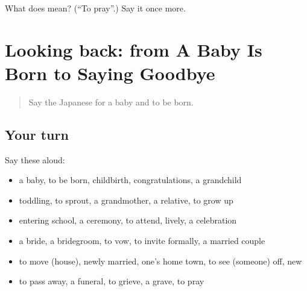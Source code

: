 \begin{tcolorbox}[breakable,colback=teal!4,colframe=teal!35!black,title={Before you move on}]
What does  mean? (\textquotedblleft{}To pray\textquotedblright{}.) Say it once more.
\end{tcolorbox}
\section[(dialogue)]{Looking back: from A Baby Is Born to Saying Goodbye}

\label{lesson:JA-R291-review-286-291}



\begin{quote}
Say the Japanese for a baby and to be born.
\end{quote}

\subsection*{Your turn}
Say these aloud:

\begin{itemize}
\raggedright
  \item a baby, to be born, childbirth, congratulations, a grandchild
  \item toddling, to sprout, a grandmother, a relative, to grow up
  \item entering school, a ceremony, to attend, lively, a celebration
  \item a bride, a bridegroom, to vow, to invite formally, a married couple
  \item to move (house), newly married, one's home town, to see (someone) off, new
  \item to pass away, a funeral, to grieve, a grave, to pray
\end{itemize}

